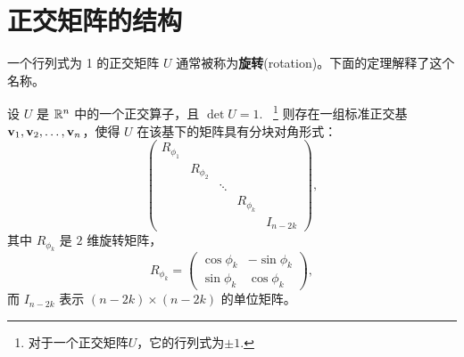 \section{正交矩阵的结构}\label{sec:06-05}

一个行列式为 1 的正交矩阵 $U$ 通常被称为\textbf{旋转}(rotation)。下面的定理解释了这个名称。

\begin{theorem}\label{stmt:06-05-01}  设 $U$ 是 $\mathbb{R}^n$ 中的一个正交算子，且 $\det U = 1$.~
\footnote{
对于一个正交矩阵$U$，它的行列式为$\pm 1$.
}
则存在一组标准正交基 $\mathbf{v}_1, \mathbf{v}_2, \dots, \mathbf{v}_n$，使得 $U$ 在该基下的矩阵具有分块对角形式：
$$\begin{pmatrix} R_{\phi_1} & & & & \\ & R_{\phi_2} & & & \\ & & \ddots & & \\ & & & R_{\phi_k} & \\ & & & & I_{n-2k} \end{pmatrix},$$
其中 $R_{\phi_k}$ 是 $2$ 维旋转矩阵，
$$R_{\phi_k} = \begin{pmatrix} \cos \phi_k & -\sin \phi_k \\ \sin \phi_k & \cos \phi_k \end{pmatrix},$$
而 $I_{n-2k}$ 表示 $(n-2k) \times (n-2k)$ 的单位矩阵。\end{theorem}

